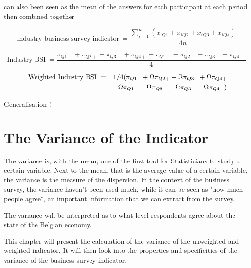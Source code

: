 \documentclass[12pt,a4paper,oneside]{book}
\begin{document}
can also been seen as the mean of the answers for each participant at each period then combined together

\begin{equation}
    \mbox{Industry business survey indicator}\ = \frac{\sum_{i=1}^n \left(x_{i Q1} + x_{i Q2} + x_{i Q3} + x_{i Q4} \right)}{4n}
\end{equation}

\begin{equation}
    \mbox{Industry BSI}\ = \frac{\pi_{Q1+} + \pi_{Q2+} + \pi_{Q3+} + \pi_{Q4+} - \pi_{Q1-} - \pi_{Q2-} - \pi_{Q3-} - \pi_{Q4-} }{4}
\end{equation}


\begin{eqnarray}
    \mbox{ Weighted Industry BSI}\ &=& 1/4 ( \pi_{Q1+} + \Omega \pi_{Q2+} + \Omega \pi_{Q3+} + \Omega \pi_{Q4+} \\
    && - \Omega \pi_{Q1-} - \Omega \pi_{Q2-} - \Omega \pi_{Q3-} - \Omega \pi_{Q4-} \Large) 
\end{eqnarray}

Generalisation !


\chapter{The Variance of the Indicator}

The variance is, with the mean, one of the first tool for Statisticians to study a certain variable. Next to the mean, that is the average value of a certain variable, the variance is the measure of the dispersion. 
In the context of the business survey, the variance haven't been used much, while it can be seen as "how much people agree", an important information that we can extract from the survey.

The variance will be interpreted as to what level respondents agree about the state of the Belgian economy.


This chapter will present the calculation of the variance of the unweighted and weighted indicator.
It will then look into the properties and specificities of the variance of the business survey indicator.

\end{document}
